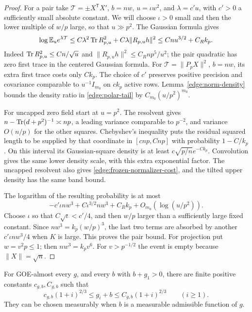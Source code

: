 \begin{proof}
For a pair take \(\mathcal T=\pm X^{\mathsf T}X'\), \(b=nw\),
\(u=\iota w^2\), and \(\lambda=c'u\), with \(c'>0\) a sufficiently
small absolute constant.  We will choose \(\iota>0\) small and then
the lower multiple of \(w/p\) large, so that \(u\gg p^2\).
The Gaussian formula gives
\begin{equation}\label{edge:quadratic-mgf}
 \log\mathbb E_u e^{\lambda\mathcal T}
 \le C\lambda^2\operatorname{Tr} R_{p,u}^2+C\lambda\|R_{p,u}h\|^2
 \le Cnu^{3/2}+C_Rk_p.
\end{equation}
Indeed \(\operatorname{Tr} R_{p,u}^2\le Cn/\sqrt u\) and
\(\|R_{p,u}h\|^2\le C_Rnp^5/u^2\); the pair quadratic has zero first
trace in the centered Gaussian formula.  For
\(\mathcal T=\|P_pX\|^2\), \(b=nw\), its extra first trace costs only
\(Ck_p\).  The choice of \(c'\) preserves positive precision and
covariance comparable to \(u^{-1}I_{m_0}\) on \(ck_p\) active rows.
Lemma~\ref{edge:norm-density} bounds the density ratio in
\eqref{edge:polar-tail} by \(C_{m_0}(u/p^2)^{m_0}\).

For uncapped zero field start at \(u=p^2\).  The resolvent gives
\(n-\operatorname{Tr}(d+p^2)^{-1}\asymp np\), a leading variance comparable to
\(p^{-2}\), and variance \(O(n/p)\) for the other squares.  Chebyshev's
inequality puts the residual squared length to be supplied by that
coordinate in \([cnp,Cnp]\) with probability \(1-C/k_p\).  On this
interval its Gaussian-square density is at least
\(c\sqrt{p/n}e^{-Ck_p}\).  Convolution gives the same lower density
scale, with this extra exponential factor.  The uncapped resolvent
also gives \eqref{edge:frozen-normalizer-cost}, and the tilted upper
density has the same band bound.

The logarithm of the resulting probability is at most
\[
 -c'\iota nw^3+C\iota^{3/2}nw^3+C_Rk_p
       +O_{m_0}(\log(u/p^2)).
\]
Choose \(\iota\) so that \(C\sqrt\iota<c'/4\), and then \(w/p\) larger
than a sufficiently large fixed constant.  Since
\(nw^3=k_p(w/p)^3\), the last two terms are absorbed by another
\(c'\iota nw^3/4\) when \(K\) is large.  This proves the pair bound.
For projection put \(w=v^2p\le1\); then \(nw^3=k_pv^6\).  For
\(v>p^{-1/2}\) the event is empty because \(\|X\|=\sqrt n\).
\end{proof}

\begin{corollary}
\label{edge:limit-growth}
For GOE-almost every \(g\), and every \(b\) with \(b+g_1>0\), there are
finite positive constants \(c_{g,b},C_{g,b}\) such that
\begin{equation}\label{edge:limit-rate-bounds}
 c_{g,b}(1+i)^{2/3}\le g_i+b\le C_{g,b}(1+i)^{2/3}
 \qquad(i\ge1).
\end{equation}
They can be chosen measurably when \(b\) is a measurable admissible
function of \(g\).
\end{corollary}

